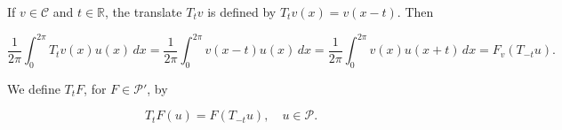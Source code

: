 If $v \in \mathcal{C}$ and $t \in \mathbb{R}$, the translate $T_t v$ is defined by $T_t v(x) = v(x - t)$. Then

$$\frac{1}{2\pi} \int_0^{2\pi} T_t v(x) u(x) \, dx = \frac{1}{2\pi} \int_0^{2\pi} v(x - t) u(x) \, dx
= \frac{1}{2\pi} \int_0^{2\pi} v(x) u(x + t) \, dx = F_v(T_{-t}u).$$

We define $T_t F$, for $F \in \mathcal{P}'$, by

$$T_t F(u) = F(T_{-t}u), \quad u \in \mathcal{P}.$$
